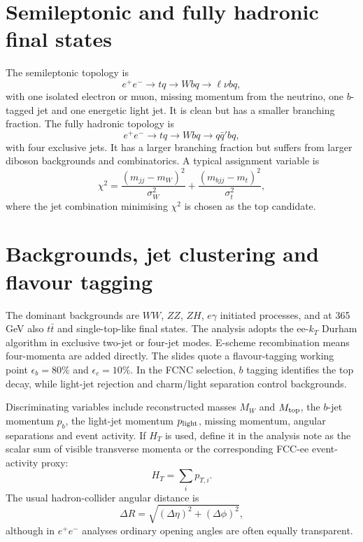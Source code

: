 \documentclass[11pt,a4paper]{report}
\newcommand{\ee}{e^+e^-}
\newcommand{\ttbar}{t\bar t}
\begin{document}
\section{Semileptonic and fully hadronic final states}
The semileptonic topology is
\begin{equation}
  \ee\to tq\to Wbq\to \ell\nu bq,
\end{equation}
with one isolated electron or muon, missing momentum from the neutrino, one $b$-tagged jet and one energetic light jet.  It is clean but has a smaller branching fraction.  The fully hadronic topology is
\begin{equation}
  \ee\to tq\to Wbq\to q\bar q' bq,
\end{equation}
with four exclusive jets.  It has a larger branching fraction but suffers from larger diboson backgrounds and combinatorics.  A typical assignment variable is
\begin{equation}
  \chi^2=\frac{(m_{jj}-m_W)^2}{\sigma_W^2}+\frac{(m_{bjj}-m_t)^2}{\sigma_t^2},
\end{equation}
where the jet combination minimising $\chi^2$ is chosen as the top candidate.

\section{Backgrounds, jet clustering and flavour tagging}
The dominant backgrounds are $WW$, $ZZ$, $ZH$, $e\gamma$ initiated processes, and at 365 GeV also $\ttbar$ and single-top-like final states.  The analysis adopts the ee-$k_T$ Durham algorithm in exclusive two-jet or four-jet modes.  E-scheme recombination means four-momenta are added directly.  The slides quote a flavour-tagging working point $\epsilon_b=80\%$ and $\epsilon_c=10\%$.  In the FCNC selection, $b$ tagging identifies the top decay, while light-jet rejection and charm/light separation control backgrounds.

Discriminating variables include reconstructed masses $M_W$ and $M_{\rm top}$, the $b$-jet momentum $p_b$, the light-jet momentum $p_{\rm light}$, missing momentum, angular separations and event activity.  If $H_T$ is used, define it in the analysis note as the scalar sum of visible transverse momenta or the corresponding FCC-ee event-activity proxy:
\begin{equation}
  H_T=\sum_i p_{T,i}.
\end{equation}
The usual hadron-collider angular distance is
\begin{equation}
  \Delta R=\sqrt{(\Delta\eta)^2+(\Delta\phi)^2},
\end{equation}
although in $\ee$ analyses ordinary opening angles are often equally transparent.
\end{document}
